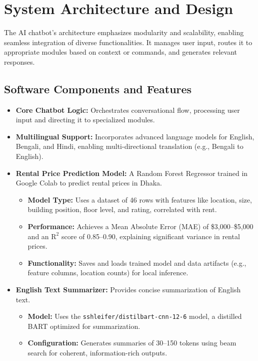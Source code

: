\documentclass[a4paper,10pt,conference]{IEEEtran}
\begin{document}
\section{System Architecture and Design}
The AI chatbot’s architecture emphasizes modularity and scalability, enabling seamless integration of diverse functionalities. It manages user input, routes it to appropriate modules based on context or commands, and generates relevant responses.

\subsection{Software Components and Features}
\begin{itemize}
    \item \textbf{Core Chatbot Logic:} Orchestrates conversational flow, processing user input and directing it to specialized modules.
    \item \textbf{Multilingual Support:} Incorporates advanced language models for English, Bengali, and Hindi, enabling multi-directional translation (e.g., Bengali to English).
    \item \textbf{Rental Price Prediction Model:} A Random Forest Regressor trained in Google Colab to predict rental prices in Dhaka.
    \begin{itemize}
        \item \textbf{Model Type:} Uses a dataset of 46 rows with features like location, size, building position, floor level, and rating, correlated with rent.
        \item \textbf{Performance:} Achieves a Mean Absolute Error (MAE) of \$3,000--\$5,000 and an $\mathrm{R}^2$ score of 0.85--0.90, explaining significant variance in rental prices.
        \item \textbf{Functionality:} Saves and loads trained model and data artifacts (e.g., feature columns, location counts) for local inference.
    \end{itemize}
    \item \textbf{English Text Summarizer:} Provides concise summarization of English text.
    \begin{itemize}
        \item \textbf{Model:} Uses the \texttt{sshleifer/distilbart-cnn-12-6} model, a distilled BART optimized for summarization.
        \item \textbf{Configuration:} Generates summaries of 30--150 tokens using beam search for coherent, information-rich outputs.
    \end{itemize}

\end{itemize}
\end{document}
